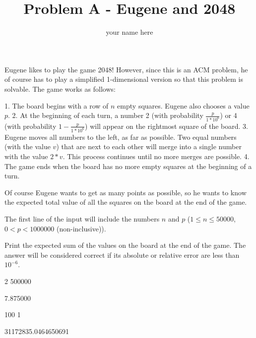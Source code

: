 \documentclass{article}
\title{Problem A - Eugene and 2048}
\author{your name here}
\begin{document}
\begin{problemDescription}
Eugene likes to play the game 2048! However, since this is an ACM problem, he of course has to play a simplified 1-dimensional version so that this problem is solvable. The game works as follows:

1. The board begins with a row of $n$ empty squares. Eugene also chooses a value $p$.
2. At the beginning of each turn, a number 2 (with probability $\frac{p}{1*10^6}$) or 4 (with probability $1 - \frac{p}{1*10^6}$) will appear on the rightmost square of the board.
3. Eugene moves all numbers to the left, as far as possible. Two equal numbers (with the value $v$) that are next to each other will merge into a single number with the value $2*v$. This process continues until no more merges are possible.
4. The game ends when the board has no more empty squares at the beginning of a turn.

Of course Eugene wants to get as many points as possible, so he wants to know the expected total value of all the squares on the board at the end of the game.
\end{problemDescription}

\begin{inputDescription}
The first line of the input will include the numbers $n$ and $p$ ($1 \leq n \leq 50000$, $0 \lt p \lt 1000000$ (non-inclusive)).
\end{inputDescription}

\begin{outputDescription}
Print the expected sum of the values on the board at the end of the game. The answer will be considered correct if its absolute or relative error are less than $10^{-6}$.
\end{outputDescription}

\begin{sampleInput}
2 500000
\end{sampleInput}

\begin{sampleOutput}
7.875000
\end{sampleOutput}

\begin{sampleInput}
100 1
\end{sampleInput}

\begin{sampleOutput}
31172835.0464650691
\end{sampleOutput}
\end{document}

